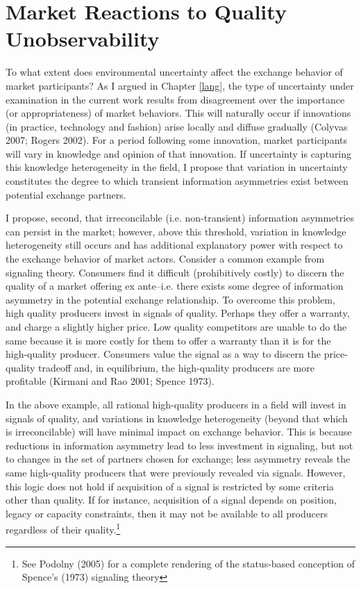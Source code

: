 \chapter{Market Reactions to Quality Unobservability \label{signal}}


To what extent does environmental uncertainty affect the exchange behavior of market participants?  As I argued in Chapter \ref{lang}, the type of uncertainty under examination in the current work results from disagreement over the importance (or appropriateness) of market behaviors. This will naturally occur if innovations (in practice, technology and fashion) arise locally and diffuse gradually (Colyvas 2007; Rogers 2002). For a period following some innovation, market participants will vary in knowledge and opinion of that innovation. If uncertainty is capturing this knowledge heterogeneity in the field, I propose that variation in uncertainty constitutes the degree to which transient information asymmetries exist between potential exchange partners. 

I propose, second, that irreconcilable (i.e. non-transient) information asymmetries can persist in the market; however, above this threshold, variation in knowledge heterogeneity still occurs and has additional explanatory power with respect to the exchange behavior of market actors. Consider a common example from signaling theory. Consumers find it difficult (prohibitively costly) to discern the quality of a market offering ex ante--i.e. there exists some degree of information asymmetry in the potential exchange relationship. To overcome this problem, high quality producers invest in signals of quality. Perhaps they offer a warranty, and charge a slightly higher price. Low quality competitors are unable to do the same because it is more costly for them to offer a warranty than it is for the high-quality producer. Consumers value the signal as a way to discern the price-quality tradeoff and, in equilibrium, the high-quality producers are more profitable (Kirmani and Rao 2001; Spence 1973).

In the above example, all rational high-quality producers in a field will invest in signals of quality, and variations in knowledge heterogeneity (beyond that which is irreconcilable) will have minimal impact on exchange behavior. This is because reductions in information asymmetry lead to less investment in signaling, but not to changes in the set of partners chosen for exchange; less asymmetry reveals the same high-quality producers that were previously revealed via signals. However, this logic does not hold if acquisition of a signal is restricted by some criteria other than quality. If for instance, acquisition of a signal depends on position, legacy or capacity constraints, then it may not be available to all producers regardless of their quality.\footnote{See Podolny (2005) for a complete rendering of the status-based conception of Spence's (1973) signaling theory} 

